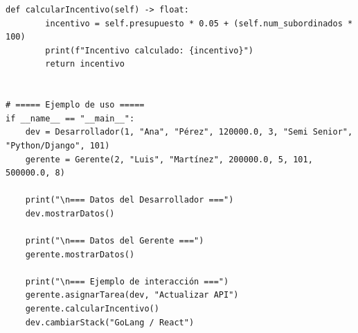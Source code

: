 \documentclass{article}
\begin{document}
\begin{lstlisting}[caption={Código python basado en el diagrama UML}, label={lst:python}]
    def calcularIncentivo(self) -> float:
        incentivo = self.presupuesto * 0.05 + (self.num_subordinados * 100)
        print(f"Incentivo calculado: {incentivo}")
        return incentivo


# ===== Ejemplo de uso =====
if __name__ == "__main__":
    dev = Desarrollador(1, "Ana", "Pérez", 120000.0, 3, "Semi Senior", "Python/Django", 101)
    gerente = Gerente(2, "Luis", "Martínez", 200000.0, 5, 101, 500000.0, 8)

    print("\n=== Datos del Desarrollador ===")
    dev.mostrarDatos()

    print("\n=== Datos del Gerente ===")
    gerente.mostrarDatos()

    print("\n=== Ejemplo de interacción ===")
    gerente.asignarTarea(dev, "Actualizar API")
    gerente.calcularIncentivo()
    dev.cambiarStack("GoLang / React")
\end{lstlisting}
\end{document}
